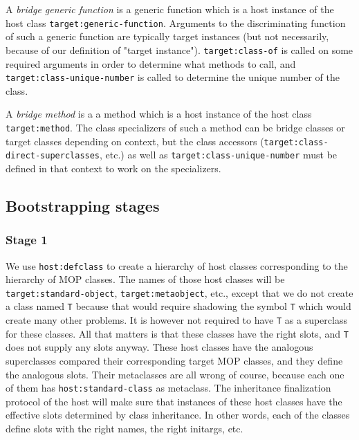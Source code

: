 \begin{definition}
A \emph{bridge generic function} is a generic function which is a host
instance of the host class \texttt{target:generic-function}.  Arguments to
the discriminating function of such a generic function are
typically target instances (but not necessarily, because of our
definition of "target instance").  \texttt{target:class-of} is called on
some required arguments in order to determine what methods to
call, and \texttt{target:class-unique-number} is called to determine the
unique number of the class.
\end{definition}

\begin{definition}
A \emph{bridge method} is a a method which is a host instance of the host
class \texttt{target:method}.  The class specializers of such a method can
be bridge classes or target classes depending on context, but the
class accessors (\texttt{target:class-direct-superclasses}, etc.) as well
as \texttt{target:class-unique-number} must be defined in that context to
work on the specializers. 
\end{definition}

\subsection{Bootstrapping stages}

\subsubsection{Stage 1}

We use \texttt{host:defclass} to create a hierarchy of host classes
corresponding to the hierarchy of MOP classes.  The names of those host
classes will be \texttt{target:standard-object},
\texttt{target:metaobject}, etc., except that we do not create a class
named \texttt{T} because that would require shadowing the symbol
\texttt{T} which would create many other problems.  It is however not
required to have \texttt{T} as a superclass for these classes.  All
that matters is that these classes have the right slots, and
\texttt{T} does not supply any slots anyway.  These host classes have
the analogous superclasses compared their corresponding target MOP
classes, and they define the analogous slots.  Their metaclasses are
all wrong of course, because each one of them has
\texttt{host:standard-class} as metaclass.  The inheritance
finalization protocol of the host will make sure that instances of
these host classes have the effective slots determined by class
inheritance.  In other words, each of the classes define slots with
the right names, the right initargs, etc.

